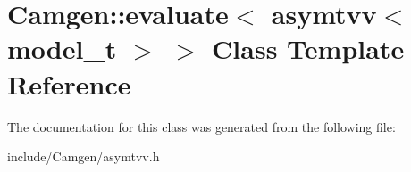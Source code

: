 \hypertarget{a00140}{\section{Camgen\-:\-:evaluate$<$ asymtvv$<$ model\-\_\-t $>$ $>$ Class Template Reference}
\label{a00140}
}


The documentation for this class was generated from the following file\-:\begin{DoxyCompactItemize}
\item 
include/\-Camgen/asymtvv.\-h\end{DoxyCompactItemize}
